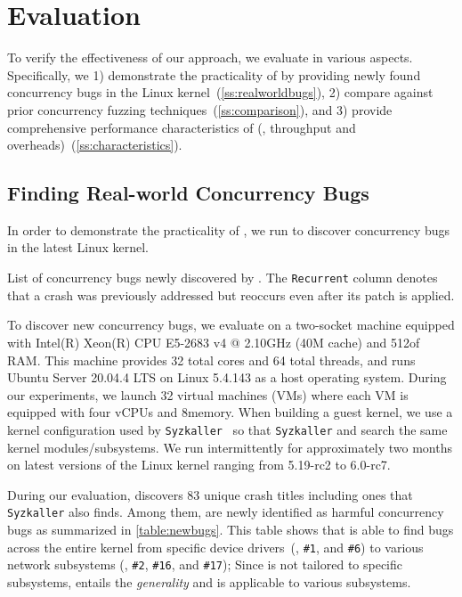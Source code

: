 \section{Evaluation}
\label{s:eval}

To verify the effectiveness of our approach, we evaluate \sys in
various aspects.
%
Specifically, we 1) demonstrate the practicality of \sys by providing
newly found concurrency bugs in the Linux
kernel~(\autoref{ss:realworldbugs}),
%
2) compare \sys against prior concurrency fuzzing
techniques~(\autoref{ss:comparison}), and
%
3) provide comprehensive performance characteristics of \sys (\eg,
throughput and overheads)~(\autoref{ss:characteristics}).
%

\subsection{Finding Real-world Concurrency Bugs}
\label{ss:realworldbugs}

In order to demonstrate the practicality of \sys, we run \sys to
discover concurrency bugs in the latest Linux kernel.

\begin{table}[t]
  \centering
  
  \caption{List of concurrency bugs newly discovered by \sys. The
    \texttt{Recurrent} column denotes that a crash was previously
    addressed but reoccurs even after its patch is applied.}
  \label{table:newbugs}
\end{table}

%
To discover new concurrency bugs, we evaluate \sys on a two-socket
machine equipped with Intel(R) Xeon(R) CPU E5-2683 v4 @ 2.10GHz (40M
cache) and 512\GB of RAM.
%
This machine provides 32 total cores and 64 total threads, and runs
Ubuntu Server 20.04.4 LTS on Linux 5.4.143 as a host operating system.
%
During our experiments, we launch 32 virtual machines (VMs) where each
VM is equipped with four vCPUs and 8\GB memory.
%
When building a guest kernel, we use a kernel configuration used by
\texttt{Syzkaller}~\cite{syzkaller} so that \texttt{Syzkaller} and
\sys search the same kernel modules/subsystems.
%
We run intermittently \sys for approximately two months on latest
versions of the Linux kernel ranging from 5.19-rc2 to 6.0-rc7.


%
During our evaluation, \sys discovers 83 unique crash titles including
ones that \texttt{Syzkaller} also finds. Among them, \totalbugs are
newly identified as harmful concurrency bugs as summarized in
\autoref{table:newbugs}.
%
This table shows that \sys is able to find bugs across the entire
kernel from specific device drivers~(\eg, \texttt{\#1}, and
\texttt{\#6}) to various network subsystems (\eg, \texttt{\#2},
\texttt{\#16}, and \texttt{\#17}); Since \sys is not tailored to
specific subsystems, \sys entails the \textit{generality} and is
applicable to various subsystems.

